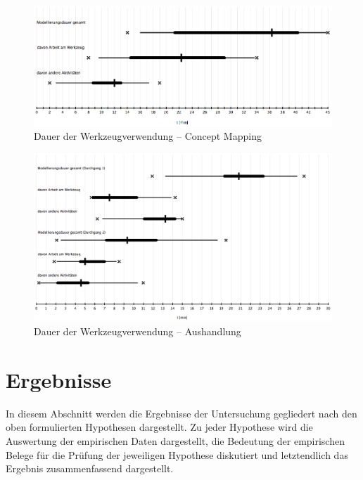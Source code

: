 \begin{figure}[htbp]
	\centering
		\includegraphics[width=15cm]{img/Evaluierung/usageTimeConceptMapping.png}
	\caption{Dauer der Werkzeugverwendung -- Concept Mapping}
	\label{fig:img_Evaluierung_usageTimeConceptMapping}
\end{figure}

\begin{figure}[htbp]
	\centering
		\includegraphics[width=15cm]{img/Evaluierung/usageTimeNegotiation.png}
	\caption{Dauer der Werkzeugverwendung -- Aushandlung}
	\label{fig:img_Evaluierung_usageTimeNegotiation}
\end{figure}


\section{Ergebnisse} %
\label{sec:ergebnisse}

In diesem Abschnitt werden die Ergebnisse der Untersuchung gegliedert nach den oben formulierten Hypothesen dargestellt. Zu jeder Hypothese wird die Auswertung der empirischen Daten dargestellt, die Bedeutung der empirischen Belege für die Prüfung der jeweiligen Hypothese diskutiert und letztendlich das Ergebnis zusammenfassend dargestellt.  

